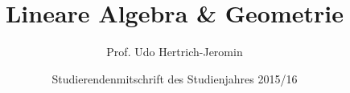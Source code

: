\documentclass[a4paper, fontsize=11pt, DIV=14, parskip=half]{scrreprt}
\author{Studierendenmitschrift des Studienjahres 2015/16}
\title{Lineare Algebra \& Geometrie}
\subtitle{Prof. Udo Hertrich-Jeromin}
\begin{document}
\maketitle
\tableofcontents

































\small
\printindex
\end{document}
